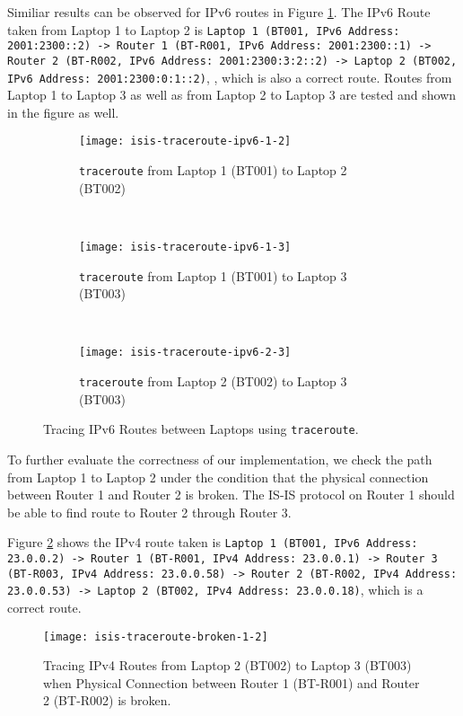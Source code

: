 Similiar results can be observed for IPv6 routes in Figure \ref{fig:isis-traceroute-ipv6}. The IPv6 Route taken from Laptop 1 to Laptop 2 is 
\texttt{Laptop 1 (BT001, IPv6 Address: 2001:2300::2)
-> Router 1 (BT-R001, IPv6 Address: 2001:2300::1) 
-> Router 2 (BT-R002, IPv6 Address: 2001:2300:3:2::2)
-> Laptop 2 (BT002, IPv6 Address: 2001:2300:0:1::2)}, , which is also a correct route.
Routes from Laptop 1 to Laptop 3 as well as from Laptop 2 to Laptop 3 are tested and shown in the figure as well.


\begin{figure}[ht!]
    \centering
    \begin{subfigure}[b]{\textwidth}
        \centering
        \texttt{[image: isis-traceroute-ipv6-1-2]}
        \caption{\texttt{traceroute} from Laptop 1 (BT001) to Laptop 2 (BT002)}
    \end{subfigure}
    ~
    \begin{subfigure}[b]{\textwidth}
        \centering
        \texttt{[image: isis-traceroute-ipv6-1-3]}
        \caption{\texttt{traceroute} from Laptop 1 (BT001) to Laptop 3 (BT003)}
    \end{subfigure}
    ~
    \begin{subfigure}[b]{\textwidth}
        \centering
        \texttt{[image: isis-traceroute-ipv6-2-3]}
        \caption{\texttt{traceroute} from Laptop 2 (BT002) to Laptop 3 (BT003)}
    \end{subfigure}
    \caption{Tracing IPv6 Routes between Laptops using \texttt{traceroute}.}
    \label{fig:isis-traceroute-ipv6}
\end{figure}

\clearpage

To further evaluate the correctness of our implementation, we check the path from Laptop 1 to Laptop 2 under the condition that the physical connection between Router 1 and Router 2 is broken. The IS-IS protocol on Router 1 should be able to find route to Router 2 through Router 3.

Figure \ref{fig:isis-traceroute-broken} shows the IPv4 route taken is 
\texttt{Laptop 1 (BT001, IPv6 Address: 23.0.0.2)
-> Router 1 (BT-R001, IPv4 Address: 23.0.0.1) 
-> Router 3 (BT-R003, IPv4 Address: 23.0.0.58) 
-> Router 2 (BT-R002, IPv4 Address: 23.0.0.53)
-> Laptop 2 (BT002, IPv4 Address: 23.0.0.18)}, which is a correct route.


\begin{figure}[ht!]
    \centering
    \texttt{[image: isis-traceroute-broken-1-2]}
    \caption{Tracing IPv4 Routes from Laptop 2 (BT002) to Laptop 3 (BT003) when Physical Connection between Router 1 (BT-R001) and Router 2 (BT-R002) is broken.}
    \label{fig:isis-traceroute-broken}
\end{figure}

